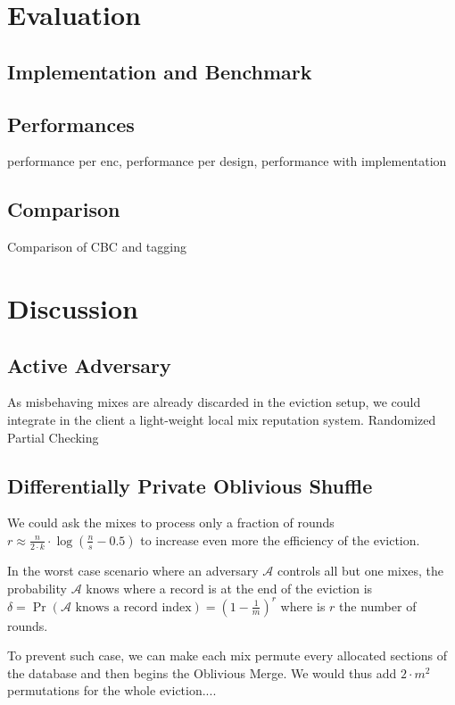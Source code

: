 \documentclass{llncs}
\begin{document}
\section{Evaluation}\label{Evaluation}
\subsection{Implementation and Benchmark}\label{Implementation}
\subsection{Performances}\label{Performance}
performance per enc, performance per design, performance with implementation
\subsection{Comparison}\label{Comparison}
Comparison of CBC and tagging


\section{Discussion}\label{Discussion}

\subsection{Active Adversary}\label{Active Adversary}
As misbehaving mixes are already discarded in the eviction setup, we could integrate in the client a light-weight local mix reputation system.
Randomized Partial Checking


\subsection{Differentially Private Oblivious Shuffle}\label{DPOS}
We could ask the mixes to process only a fraction of rounds $r \approx \frac{n}{2\cdot k }  \cdot \log \left (\frac{n}{s}-0.5 \right)$ to increase even more the efficiency of the eviction.

In the worst case scenario where an adversary $\mathcal{A}$ controls all but one mixes, the probability  $\mathcal{A}$ knows where a record is at the end of the eviction is $\delta= \Pr \left ( \mathcal{A} \text{ knows a record index}\right ) = \left ( 1 - \frac{1}{m} \right )^r$ where is $r$ the number of rounds.

To prevent such case, we can make each mix permute every allocated sections of the database and then begins the Oblivious Merge. We would thus add $2 \cdot m^2$ permutations for the whole eviction....
\end{document}
